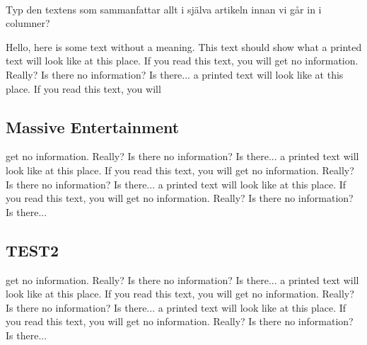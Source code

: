 \documentclass{article}
\begin{document}
  \thispagestyle{empty}

  \\
  \hspace*{1cm}
  {
    \hspace{0.5cm}
  }

  \vspace{0.4cm}
  {\large Typ den textens som sammanfattar allt i själva artikeln innan vi går in i
  columner?}
  \vspace{0.3cm}

  \begin{multicols*}{2}[]


  Hello, here is some text without a meaning.  This text should show what
  a printed text will look like at this place. If you read this text, you
  will get no information.  Really?  Is there no information?  Is there... a
  printed text will look like at this place. If you read this text, you will


  \subsection*{Massive Entertainment}
  get no information.  Really?  Is there no information?  Is there... a
  printed text will look like at this place. If you read this text, you will
  get no information.  Really?  Is there no information?  Is there... a
  printed text will look like at this place. If you read this text, you will
  get no information.  Really?  Is there no information?  Is there...

  \subsection*{TEST2}

  get no information.  Really?  Is there no information?  Is there... a
  printed text will look like at this place. If you read this text, you will
  get no information.  Really?  Is there no information?  Is there... a
  printed text will look like at this place. If you read this text, you will
  get no information.  Really?  Is there no information?  Is there...

  \end{multicols*}
\end{document}
